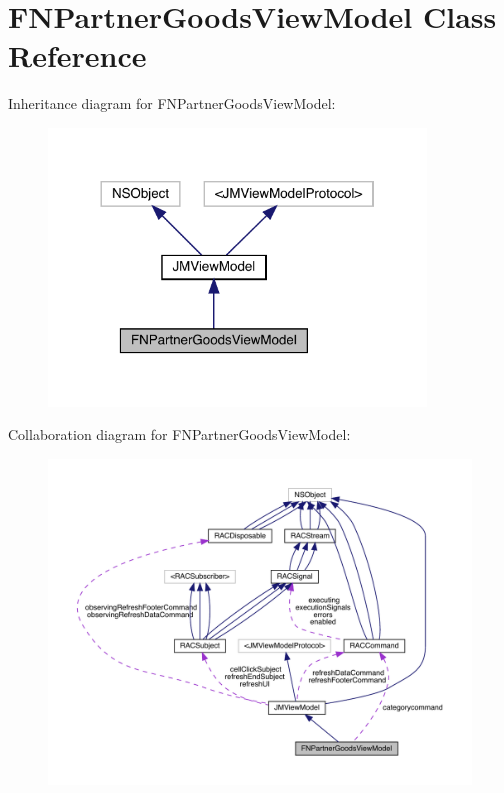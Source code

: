 \hypertarget{interface_f_n_partner_goods_view_model}{}\section{F\+N\+Partner\+Goods\+View\+Model Class Reference}
\label{interface_f_n_partner_goods_view_model}


Inheritance diagram for F\+N\+Partner\+Goods\+View\+Model\+:\nopagebreak
\begin{figure}[H]
\begin{center}
\leavevmode
\includegraphics[width=284pt]{interface_f_n_partner_goods_view_model__inherit__graph}
\end{center}
\end{figure}


Collaboration diagram for F\+N\+Partner\+Goods\+View\+Model\+:\nopagebreak
\begin{figure}[H]
\begin{center}
\leavevmode
\includegraphics[width=350pt]{interface_f_n_partner_goods_view_model__coll__graph}
\end{center}
\end{figure}
